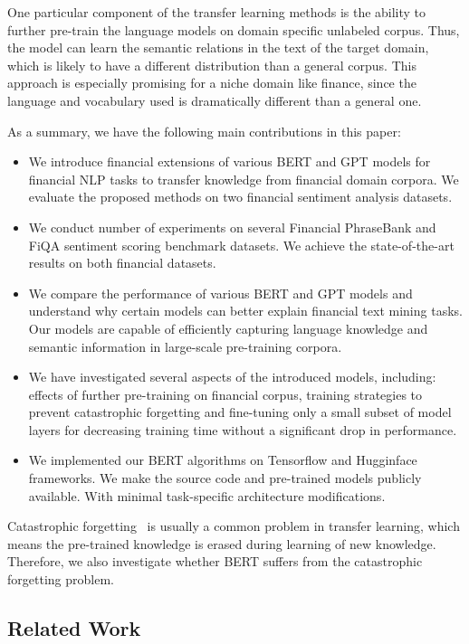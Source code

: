 \documentclass[11pt]{article}
\begin{document}
One particular component of the transfer learning methods is the
ability to further pre-train the language models on domain specific
unlabeled corpus. Thus, the model can learn the semantic relations
in the text of the target domain, which is likely to have a different
distribution than a general corpus. This approach is especially
promising for a niche domain like finance, since the language and
vocabulary used is dramatically different than a general one.

As a summary, we have the following main contributions in this paper:

\begin{itemize}
\item We introduce financial extensions of various BERT and GPT models
  for financial NLP tasks to transfer knowledge from financial domain
  corpora. We evaluate the proposed methods on two
   financial sentiment analysis datasets.
\item We conduct number of experiments on several Financial PhraseBank and FiQA sentiment scoring
  benchmark datasets. We achieve the state-of-the-art results on both financial datasets.
\item We compare the performance of various BERT and GPT models and
  understand why certain models can better explain financial text
  mining tasks. Our models are capable of efficiently capturing language knowledge and semantic
information in large-scale pre-training corpora.
\item We have investigated several aspects of the introduced models, including: effects of further pre-training on financial
corpus, training strategies to prevent catastrophic forgetting and fine-tuning only a small subset of model layers
for decreasing training time without a significant drop in performance.
  \item We implemented our BERT algorithms on Tensorflow and Hugginface
  frameworks. We make the source code and pre-trained models publicly
  available. With minimal task-specific architecture modifications.
\end{itemize}

Catastrophic forgetting~\cite{mccloskey1989} is usually a common problem in transfer learning, which means the pre-trained knowledge is erased during learning of new knowledge.
Therefore, we also investigate whether BERT suffers from the catastrophic forgetting problem.



\subsection{Related Work}
\end{document}
